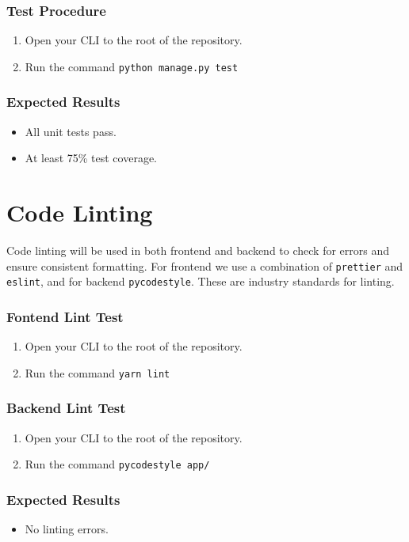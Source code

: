 \documentclass[a4paper, draft]{article}
\begin{document}
\subsubsection{Test Procedure}
\begin{enumerate}
  \item Open your CLI to the root of the repository.
  \item Run the command \texttt{python manage.py test}
\end{enumerate}

\subsubsection{Expected Results}
\begin{itemize}
  \item All unit tests pass.
  \item At least 75\% test coverage.
\end{itemize}

\newpage
\section{Code Linting}
Code linting will be used in both frontend and backend to check for errors and ensure consistent formatting. For frontend we use a combination of \texttt{prettier} and \texttt{eslint}, and for backend \texttt{pycodestyle}. These are industry standards for linting.
\subsubsection{Fontend Lint Test}
\begin{enumerate}
  \item Open your CLI to the root of the repository.
  \item Run the command \texttt{yarn lint}
\end{enumerate}

\subsubsection{Backend Lint Test}
\begin{enumerate}
  \item Open your CLI to the root of the repository.
  \item Run the command \texttt{pycodestyle app/}
\end{enumerate}

\subsubsection{Expected Results}
\begin{itemize}
  \item No linting errors.
\end{itemize}
\end{document}
